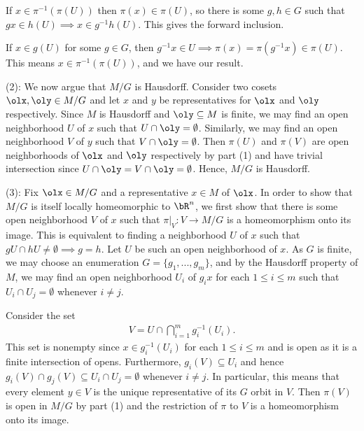 \begin{homework}[e]
\begin{prf}
		If $x \in \pi^{-1}(\pi(U))$ then $\pi(x) \in \pi(U)$, so there is some $g,h \in G$ such that $gx \in h(U) \implies x \in g^{-1}h(U)$. This gives the forward inclusion.

		If $x \in g(U)$ for some $g \in G$, then $g^{-1}x \in U \implies \pi(x) = \pi(g^{-1}x) \in \pi(U)$. This means $x \in \pi^{-1}(\pi(U))$, and we have our result.

		\bigskip

		\noindent (2): \hspace{1em} We now argue that $M/G$ is Hausdorff. Consider two cosets $\olx,\oly \in M/G$ and let $x$ and $y$ be representatives for $\olx$ and $\oly$ respectively. Since $M$ is Hausdorff and $\oly \subseteq M$ is finite, we may find an open neighborhood $U$ of $x$ such that $U \cap \oly = \emptyset$. Similarly, we may find an open neighborhood $V$ of $y$ such that $V \cap \oly = \emptyset$. Then $\pi(U)$ and $\pi(V)$ are open neighborhoods of $\olx$ and $\oly$ respectively by part (1) and have trivial intersection since $U \cap \oly = V \cap \oly = \emptyset$. Hence, $M/G$ is Hausdorff.

		\bigskip

		\noindent (3): \hspace{1em} Fix $\olx \in M/G$ and a representative $x \in M$ of $\olx$. In order to show that $M/G$ is itself locally homeomorphic to $\bR^n$, we first show that there is some open neighborhood $V$ of $x$ such that $\pi|_V:V\to M/G$ is a homeomorphism onto its image. This is equivalent to finding a neighborhood $U$ of $x$ such that $gU \cap hU \neq \emptyset \implies g = h$. Let $U$ be such an open neighborhood of $x$. As $G$ is finite, we may choose an enumeration $G = \{g_1,...,g_m\}$, and by the Hausdorff property of $M$, we may find an open neighborhood $U_i$ of $g_ix$ for each $1\leq i\leq m$ such that $U_i \cap U_j = \emptyset$ whenever $i \neq j$. 

		Consider the set
		\begin{align*}
			V = U \cap \bigcap_{i=1}^m g_i^{-1}(U_i).
		\end{align*}
		This set is nonempty since $x \in g_i^{-1}(U_i)$ for each $1\leq i\leq m$ and is open as it is a finite intersection of opens. Furthermore, $g_i(V) \subseteq U_i$ and hence $g_i(V) \cap g_j(V) \subseteq U_i \cap U_j = \emptyset$ whenever $i \neq j$. In particular, this means that every element $y \in V$ is the unique representative of its $G$ orbit in $V$. Then $\pi(V)$ is open in $M/G$ by part (1) and the restriction of $\pi$ to $V$ is a homeomorphism onto its image.


\end{prf}
\end{homework}
